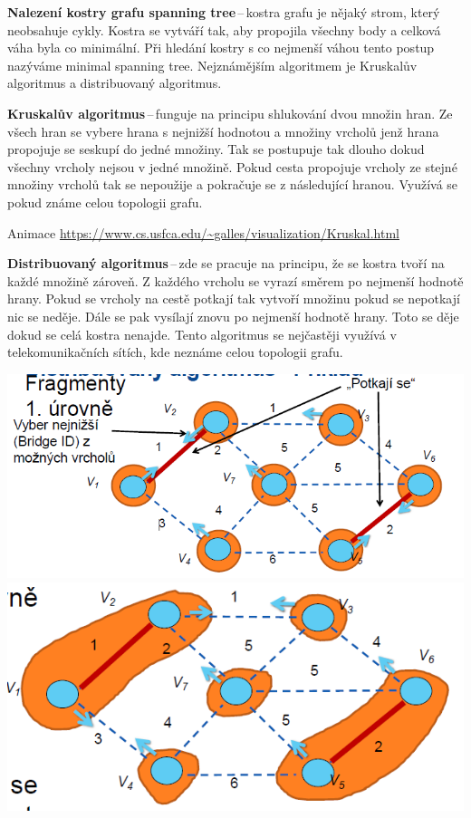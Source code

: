 \textbf{Nalezení kostry grafu spanning tree}\,--\,kostra grafu je nějaký strom, který neobsahuje cykly. Kostra se vytváří tak, aby propojila všechny body a celková váha byla co minimální. Při hledání kostry s co nejmenší váhou tento postup nazýváme minimal spanning tree. Nejznámějším algoritmem je Kruskalův algoritmus a distribuovaný algoritmus.

\textbf{Kruskalův algoritmus}\,--\,funguje na principu shlukování dvou množin hran. Ze všech hran se vybere hrana s nejnižší hodnotou a množiny vrcholů jenž hrana propojuje se seskupí do jedné množiny. Tak se postupuje tak dlouho dokud všechny vrcholy nejsou v jedné množině. Pokud cesta propojuje vrcholy ze stejné množiny vrcholů tak se nepoužije a pokračuje se z následující hranou. Využívá se pokud známe celou topologii grafu.

Animace \url{https://www.cs.usfca.edu/~galles/visualization/Kruskal.html}

\textbf{Distribuovaný algoritmus}\,--\,zde se pracuje na principu, že se kostra tvoří na každé množině zároveň. Z každého vrcholu se vyrazí směrem po nejmenší hodnotě hrany. Pokud se vrcholy na cestě potkají tak vytvoří množinu pokud se nepotkají nic se neděje. Dále se pak vysílají znovu po nejmenší hodnotě hrany. Toto se děje dokud se celá kostra nenajde. Tento algoritmus se nejčastěji využívá v telekomunikačních sítích, kde neznáme celou topologii grafu.

\begin{center}
\includegraphics[scale=0.5]{BPC-TIN/images/distributed1.PNG}
\includegraphics[scale=0.5]{BPC-TIN/images/distributed2.PNG}
\end{center}

